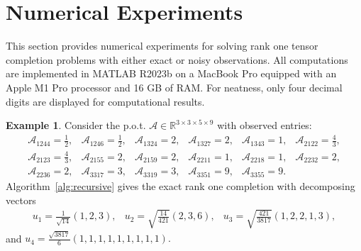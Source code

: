 \documentclass{amsart}
\newcommand{\re}{\mathbb{R}}
\newcommand{\mc}[1]{\mathcal{#1}}
\newcommand{\baray}{\begin{array}}
\newcommand{\earay}{\end{array}}
\theoremstyle{definition}
\newtheorem{example}[theorem]{Example}
\numberwithin{equation}{section}
\begin{document}
\section{Numerical Experiments}\label{sc:num_exp}

This section provides numerical experiments for solving rank one tensor completion problems with either exact or noisy observations.
All computations are implemented in MATLAB R2023b on a MacBook Pro equipped with an Apple M1 Pro processor and 16 GB of RAM. 
For neatness, only four decimal digits are displayed for computational results.




\begin{example}
Consider the p.o.t. $\mc{A} \in \re^{3 \times 3 \times 5 \times 9}$ with observed entries:
\[
\baray{cccccc}
\mc{A}_{1     2     4     4} = \frac{1}{2}, &
\mc{A}_{1     2     4     6} = \frac{1}{2}, &
\mc{A}_{1     3     2     4} = 2, &
\mc{A}_{1     3     2     7} = 2, &
\mc{A}_{1     3     4     3} = 1, &
\mc{A}_{2     1     2     2} = \frac{4}{3}, \\
\mc{A}_{2     1     2     3} = \frac{4}{3}, &
\mc{A}_{2     1     5     5} = 2, &
\mc{A}_{2     1     5     9} = 2, &
\mc{A}_{2     2     1     1} = 1, &
\mc{A}_{2     2     1     8} = 1, &
\mc{A}_{2     2     3     2} = 2, \\
\mc{A}_{2     2     3     6} = 2, &
\mc{A}_{3     3     1     7} = 3, &
\mc{A}_{3     3     1     9} = 3, &
\mc{A}_{3     3     5     1} = 9, &
\mc{A}_{3     3     5     5} = 9.
\earay
\]
Algorithm~\ref{alg:recursive} gives the exact rank one completion with decomposing vectors
\[
\baray{ccc}
u_1 = \frac{1}{\sqrt{14}} (1,2,3),
&
u_2 = \sqrt{\frac{14}{421}} (2,3,6),
&
u_3 = \sqrt{\frac{421}{3817}} (1,2,2,1,3),
\earay
\]
and 
$
u_4 = \frac{\sqrt{3817}}{6} (1,1,1,1,1,1,1,1,1).
$

\end{example}
\end{document}
